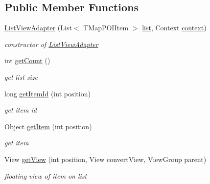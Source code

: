 \subsection*{Public Member Functions}
\begin{DoxyCompactItemize}
\item 
\mbox{\hyperlink{classhi_1_1world_1_1hello_1_1myapplication_1_1_list_view_adapter_ac7ae7f029134c2281c453b8e449365d6}{List\+View\+Adapter}} (List$<$ T\+Map\+P\+O\+I\+Item $>$ \mbox{\hyperlink{classhi_1_1world_1_1hello_1_1myapplication_1_1_list_view_adapter_adbc7d93004ca3fd896d3aa34fea5aec0}{list}}, Context \mbox{\hyperlink{classhi_1_1world_1_1hello_1_1myapplication_1_1_list_view_adapter_a71fc8d65a832fec714a0ea56c63536fe}{context}})
\begin{DoxyCompactList}\small\item\em constructor of \mbox{\hyperlink{classhi_1_1world_1_1hello_1_1myapplication_1_1_list_view_adapter}{List\+View\+Adapter}} \end{DoxyCompactList}\item 
int \mbox{\hyperlink{classhi_1_1world_1_1hello_1_1myapplication_1_1_list_view_adapter_a0472043e23ede876a595e43dc0a1efcc}{get\+Count}} ()
\begin{DoxyCompactList}\small\item\em get list size \end{DoxyCompactList}\item 
long \mbox{\hyperlink{classhi_1_1world_1_1hello_1_1myapplication_1_1_list_view_adapter_abf2e048cb1d281b162ccbbf547d13ffe}{get\+Item\+Id}} (int position)
\begin{DoxyCompactList}\small\item\em get item id \end{DoxyCompactList}\item 
Object \mbox{\hyperlink{classhi_1_1world_1_1hello_1_1myapplication_1_1_list_view_adapter_ae1620b5eabf5876fb4a8184780e56802}{get\+Item}} (int position)
\begin{DoxyCompactList}\small\item\em get item \end{DoxyCompactList}\item 
View \mbox{\hyperlink{classhi_1_1world_1_1hello_1_1myapplication_1_1_list_view_adapter_a1a3e06698d2fb86b38e6042010dace6a}{get\+View}} (int position, View convert\+View, View\+Group parent)
\begin{DoxyCompactList}\small\item\em floating view of item on list \end{DoxyCompactList}\end{DoxyCompactItemize}

